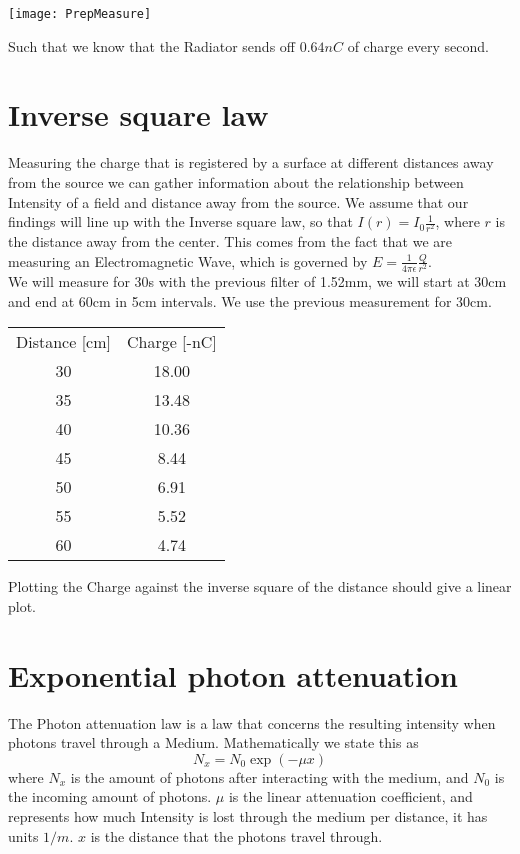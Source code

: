 \documentclass[]{scrartcl}
\begin{document}
\begin{centering}
\texttt{[image: PrepMeasure]}
\end{centering}
Such that we know that the Radiator sends off $0.64nC$ of charge every second.
\section{Inverse square law}


Measuring the charge that is registered by a surface at different distances away from the source we can gather information about the relationship between Intensity of a field and distance away from the source. We assume that our findings will line up with the Inverse square law, so that $I(r) = I_0\frac{1}{r^2}$, where $r$ is the distance away from the center. This comes from the fact that we are measuring an Electromagnetic Wave, which is governed by $E = \frac{1}{4\pi\epsilon}\frac{Q}{r^2}$.\\

We will measure for 30s with the previous filter of 1.52mm, we will start at 30cm and end at 60cm in 5cm intervals. We use the previous measurement for 30cm.

\begin{center}
	\begin{tabular}{||c|c||}
		\hline
		Distance [cm] & Charge [-nC] \\
		30 & 18.00\\
		35 & 13.48\\
		40 & 10.36\\
		45 & 8.44\\
		50 & 6.91\\
		55 & 5.52\\
		60 & 4.74\\
		\hline
	\end{tabular}
\end{center}

Plotting the Charge against the inverse square of the distance should give a linear plot.

\section{Exponential photon attenuation}
The Photon attenuation law is a law that concerns the resulting intensity when photons travel through a Medium. Mathematically we state this as
\begin{equation}
	N_x = N_0 \exp(-\mu x)
\end{equation}
where $N_x$ is the amount of photons after interacting with the medium, and $N_0$ is the incoming amount of photons. $\mu$ is the linear attenuation coefficient, and represents how much Intensity is lost through the medium per distance, it has units $1/m$. $x$ is the distance that the photons travel through.
\end{document}
